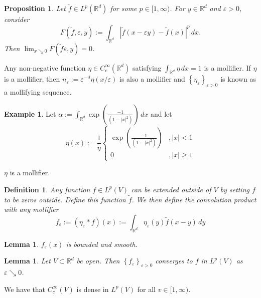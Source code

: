 \documentclass{article}
\newtheorem{proposition}[theorem]{Proposition}
\newtheorem{lemma}[theorem]{Lemma}
\newtheorem{definition}[theorem]{Definition}
\theoremstyle{definition}
\newtheorem{example}[theorem]{Example}
\numberwithin{theorem}{section}
\numberwithin{equation}{section}
\begin{document}
\begin{proposition}
	Let $\tilde{f} \in L^p(\mathbb{R}^d)$ for some $p \in [1, \infty)$. For $y \in \mathbb{R}^d$ and $\varepsilon > 0$, consider
	\begin{equation}
		F(\tilde{f}, \varepsilon, y) := \int_{\mathbb{R}^d} |\tilde{f}(x - \varepsilon y) - \tilde{f}(x)|^p \, dx.
	\end{equation}
	Then $\lim_{x \searrow 0} F(\tilde{f} \varepsilon, y) = 0$. 
\end{proposition}
Any non-negative function $\eta \in C^\infty_c(\mathbb{R}^d)$ satisfying $\int_{\mathbb{R}^d} \eta \, dx = 1$ is a mollifier. If $\eta$ is a mollifier, then $n_\varepsilon := \varepsilon^{-d} \eta(x/\varepsilon)$ is also a mollifier and $\left\{\eta_\varepsilon \right\}_{\varepsilon > 0}$ is known as a mollifying sequence. 
\begin{example}
	Let $\alpha := \int_{\mathbb{R}^d}\exp(\frac{-1}{(1 - |x|^2)})\, dx$ and let 
		\begin{equation}
			\eta(x) := \frac{1}{\eta}\begin{cases}
				\exp(\frac{-1}{(1 - |x|^2)}) &, |x| < 1\\
				0 &, |x| \geq 1
			\end{cases}
		\end{equation}
\end{example} 
$\eta$ is a mollifier. 

\begin{definition}
	Any function $f \in L^p(V)$ can be extended outside of $V$ by setting $f$ to be zeros outside. Define this function $\tilde{f}$. We then define the convolution product with any mollifier
	\begin{equation}
		f_\varepsilon := (\eta_\varepsilon \ast f )(x) := \int_{\mathbb{R}^d} \eta_\varepsilon(y) \tilde{f}(x - y) \, dy
	\end{equation}
\end{definition}

\begin{lemma}
	$f_\varepsilon(x)$ is bounded and smooth. 
\end{lemma}

\begin{lemma}
	Let $V \subset \mathbb{R}^d$ be open. Then $\left\{f_\varepsilon \right\}_{\varepsilon > 0}$ converges to $f$ in $L^p(V)$ as $\varepsilon \searrow 0$. 
\end{lemma}

We have that $C^\infty_c(V)$ is dense in $L^p(V)$ for all $v \in [1, \infty)$. 
\end{document}
